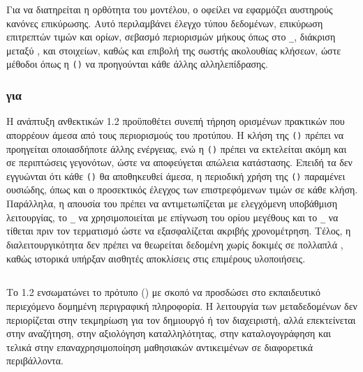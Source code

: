 Για να διατηρείται η ορθότητα του μοντέλου, ο  οφείλει να εφαρμόζει αυστηρούς κανόνες επικύρωσης. Αυτό περιλαμβάνει έλεγχο τύπου δεδομένων, επικύρωση επιτρεπτών τιμών και ορίων, σεβασμό περιορισμών μήκους όπως στο \texttt{\_}, διάκριση μεταξύ ,  και  στοιχείων, καθώς και επιβολή της σωστής ακολουθίας κλήσεων, ώστε μέθοδοι όπως η \texttt{()} να προηγούνται κάθε άλλης αλληλεπίδρασης.

\subsubsection{  για  }

Η ανάπτυξη ανθεκτικών  1.2  προϋποθέτει συνεπή τήρηση ορισμένων πρακτικών που απορρέουν άμεσα από τους περιορισμούς του προτύπου. Η κλήση της \texttt{()} πρέπει να προηγείται οποιασδήποτε άλλης ενέργειας, ενώ η \texttt{()} πρέπει να εκτελείται ακόμη και σε περιπτώσεις  γεγονότων, ώστε να αποφεύγεται απώλεια κατάστασης. Επειδή τα  δεν εγγυώνται ότι κάθε \texttt{()} θα αποθηκευθεί άμεσα, η περιοδική χρήση της \texttt{()} παραμένει ουσιώδης, όπως και ο προσεκτικός έλεγχος των επιστρεφόμενων τιμών σε κάθε κλήση. Παράλληλα, η απουσία του  πρέπει να αντιμετωπίζεται με ελεγχόμενη υποβάθμιση λειτουργίας, το \texttt{\_} να χρησιμοποιείται με επίγνωση του ορίου μεγέθους και το \texttt{\_} να τίθεται πριν τον τερματισμό ώστε να εξασφαλίζεται ακριβής χρονομέτρηση. Τέλος, η διαλειτουργικότητα δεν πρέπει να θεωρείται δεδομένη χωρίς δοκιμές σε πολλαπλά , καθώς ιστορικά υπήρξαν αισθητές αποκλίσεις στις επιμέρους υλοποιήσεις.

\subsection{}
\label{subsec:scorm12_metadata}

Το  1.2 ενσωματώνει το πρότυπο     () με σκοπό να προσδώσει στο εκπαιδευτικό περιεχόμενο δομημένη περιγραφική πληροφορία. Η λειτουργία των μεταδεδομένων δεν περιορίζεται στην τεκμηρίωση για τον δημιουργό ή τον διαχειριστή, αλλά επεκτείνεται στην αναζήτηση, στην αξιολόγηση καταλληλότητας, στην καταλογογράφηση και τελικά στην επαναχρησιμοποίηση μαθησιακών αντικειμένων σε διαφορετικά περιβάλλοντα.

